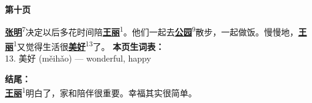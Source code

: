 \documentclass[20pt]{extarticle}
\newcommand{\glossedword}[2]{\uline{\textbf{#1}}\textsuperscript{#2}}
\begin{document}
\begin{center}
    {\fontsize{36}{44}\selectfont \textbf{第十页}}
\end{center}
\vspace{2em}
{\fontsize{22}{30}\selectfont
\noindent
\glossedword{张明}{7}决定以后多花时间陪\glossedword{王丽}{1}。他们一起去\glossedword{公园}{9}散步，一起做饭。慢慢地，\glossedword{王丽}{1}又觉得生活很\glossedword{美好}{13}了。
}
\vfill
{\fontsize{18}{26}\selectfont
\noindent
\textbf{本页生词表：}\\[0.5em]
13. 美好 (měihǎo) — wonderful, happy
}

\vfill
{\fontsize{20}{28}\selectfont
\noindent
\textbf{结尾：}\\
\glossedword{王丽}{1}明白了，家和陪伴很重要。幸福其实很简单。
}
\end{document}
